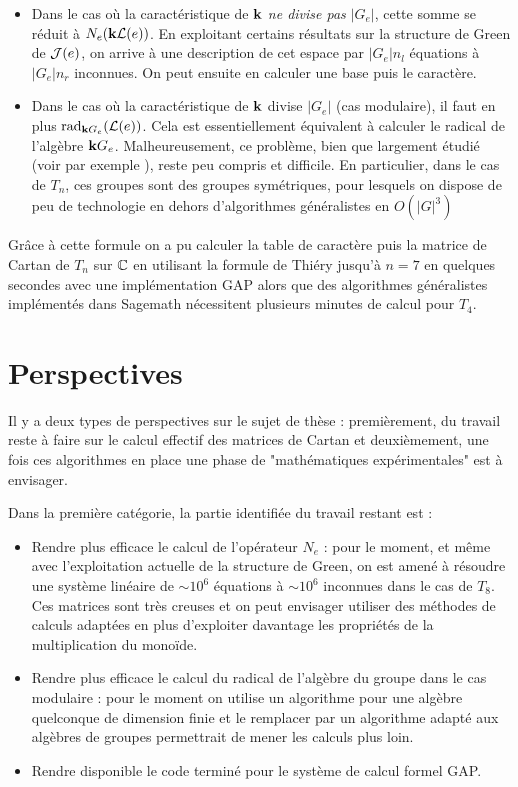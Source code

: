 \documentclass{article}
\begin{document}
	\begin{itemize}
		\item Dans le cas où la caractéristique de $\mathbf{k}$ \emph{ne divise pas} $|G_e|$, cette somme se réduit à $N_e(\mathbf{k} \mathcal{L}(e))$. En exploitant certains résultats sur la structure de Green de $\mathcal{J}(e)$, on arrive à une description de cet espace par $|G_e|n_l$ équations à $|G_e|n_r$ inconnues. On peut ensuite en calculer une base puis le caractère.
		\item Dans le cas où la caractéristique de $\mathbf{k}$ divise $|G_e|$ (cas modulaire), il faut en plus $\operatorname{rad}_{\mathbf{k} G_e}(\mathcal{L}(e))$. Cela est essentiellement équivalent à calculer le radical de l'algèbre $\mathbf{k} G_e$. Malheureusement, ce problème, bien que largement étudié (voir par exemple \cite{karpilovsky1987jacobson}), reste peu compris et difficile. En particulier, dans le cas de $T_n$, ces groupes sont des groupes symétriques, pour lesquels on dispose de peu de technologie en dehors d'algorithmes généralistes en $O(|G|^3)$ 
	\end{itemize}
	
	Grâce à cette formule on a pu calculer la table de caractère puis la matrice de Cartan de $T_n$ sur $\mathbb{C}$ en utilisant la formule de Thiéry jusqu'à $n = 7$ en quelques secondes avec une implémentation GAP alors que des algorithmes généralistes implémentés dans Sagemath nécessitent plusieurs minutes de calcul pour $T_4$.
	
	\section*{Perspectives}
	
	Il y a deux types de perspectives sur le sujet de thèse : premièrement, du travail reste à faire sur le calcul effectif des matrices de Cartan et deuxièmement, une fois ces algorithmes en place une phase de "mathématiques expérimentales" est à envisager.
	
	Dans la première catégorie, la partie identifiée du travail restant est :
	\begin{itemize}
		\item Rendre plus efficace le calcul de l'opérateur $N_e$ : pour le moment, et même avec l'exploitation actuelle de la structure de Green, on est amené à résoudre une système linéaire de $\sim 10^6$ équations à $\sim 10^6$ inconnues dans le cas de $T_8$. Ces matrices sont très creuses et on peut envisager utiliser des méthodes de calculs adaptées en plus d'exploiter davantage les propriétés de la multiplication du monoïde.
		\item Rendre plus efficace le calcul du radical de l'algèbre du groupe dans le cas modulaire : pour le moment on utilise un algorithme pour une algèbre quelconque de dimension finie et le remplacer par un algorithme adapté aux algèbres de groupes permettrait de mener les calculs plus loin.
		\item Rendre disponible le code terminé pour le système de calcul formel GAP.
	\end{itemize}
\end{document}
